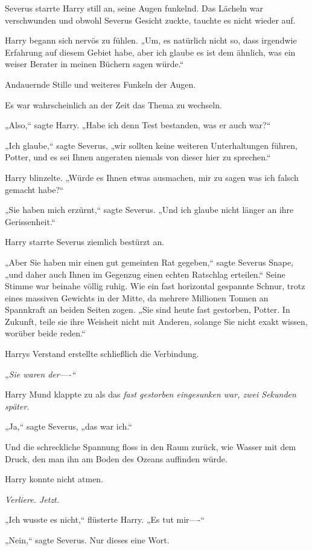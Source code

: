 {Severus starrte Harry still an, seine Augen funkelnd. Das Lächeln war verschwunden und obwohl Severus Gesicht zuckte, tauchte es nicht wieder auf.

Harry begann sich nervös zu fühlen. „Um, es natürlich nicht so, dass irgendwie Erfahrung auf diesem Gebiet habe, aber ich glaube es ist dem ähnlich, was ein weiser Berater in meinen Büchern sagen würde.“

Andauernde Stille und weiteres Funkeln der Augen.

Es war wahrscheinlich an der Zeit das Thema zu wechseln.

„Also,“ sagte Harry. „Habe ich denn Test bestanden, was er auch war?“

„Ich glaube,“ sagte Severus, „wir sollten keine weiteren Unterhaltungen führen, Potter, und es sei Ihnen angeraten niemals von dieser hier zu sprechen.“

Harry blinzelte. „Würde es Ihnen etwas ausmachen, mir zu sagen was ich falsch gemacht habe?“

„Sie haben mich erzürnt,“ sagte Severus. „Und ich glaube nicht länger an ihre Gerissenheit.“

Harry starrte Severus ziemlich bestürzt an.

„Aber Sie haben mir einen gut gemeinten Rat gegeben,“ sagte Severus Snape, „und daher auch Ihnen im Gegenzug einen echten Ratschlag erteilen.“ Seine Stimme war beinahe völlig ruhig. Wie ein fast horizontal gespannte Schnur, trotz eines massiven Gewichts in der Mitte, da mehrere Millionen Tonnen an Spannkraft an beiden Seiten zogen. „Sie sind heute fast gestorben, Potter. In Zukunft, teile sie ihre Weisheit nicht mit Anderen, solange Sie nicht exakt wissen, worüber beide reden.“

Harrys Verstand erstellte schließlich die Verbindung.

„\emph{Sie waren der----“}

Harry Mund klappte zu als das \emph{fast gestorben eingesunken war, zwei Sekunden später.}

„Ja,“ sagte Severus, „das war ich.“

Und die schreckliche Spannung floss in den Raum zurück, wie Wasser mit dem Druck, den man ihn am Boden des Ozeans auffinden würde.

Harry konnte nicht atmen.

\emph{Verliere. Jetzt.}

„Ich wusste es nicht,“ flüsterte Harry. „Es tut mir----“

„Nein,“ sagte Severus. Nur dieses eine Wort.

}
